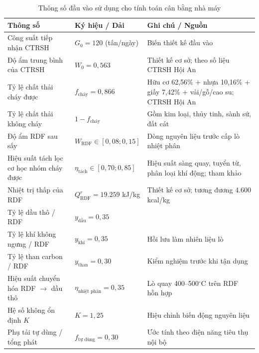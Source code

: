 \documentclass[../main.tex]{subfiles}
\begin{document}
\begin{table}[htbp]
\centering
\caption{Thông số đầu vào sử dụng cho tính toán cân bằng nhà máy}
\label{tab:thong-so-dau-vao}
\setlength{\tabcolsep}{5pt}
\small
\begin{tabular}{p{}p{}p{}}
\toprule
\textbf{Thông số} & \textbf{Ký hiệu / Dải} & \textbf{Ghi chú / Nguồn} \\
\midrule
Công suất tiếp nhận CTRSH & $G_0 = 120$ (tấn/ngày) & Biến thiết kế đầu vào \\
\midrule
Độ ẩm trung bình của CTRSH & $W_0 = 0{,}563$ & Thiết kế cơ sở; theo số liệu CTRSH Hội An \cite{BaocaoHoiAn2024} \\
\midrule
Tỷ lệ chất thải cháy được & $f_{\text{cháy}} = 0{,}866$ & Hữu cơ 62,56\% + nhựa 10,16\% + giấy 7,42\% + vải/gỗ/cao su; CTRSH Hội An \\
\midrule
Tỷ lệ chất thải không cháy & $1 - f_{\text{cháy}}$ & Gồm kim loại, thủy tinh, sành sứ, đất cát \\
\midrule
Độ ẩm RDF sau sấy & $W_{\text{RDF}} \in [0{,}08; 0{,}15]$ & Dòng nguyên liệu trước cấp lò nhiệt phân \\
\midrule
Hiệu suất tách lọc cơ học nhóm cháy được & $\eta_{\text{tách}} \in [0{,}70; 0{,}85]$ & Hiệu suất sàng quay, tuyển từ, phân loại khí động; tham khảo \cite{Arena2012} \\
\midrule
Nhiệt trị thấp của RDF & $Q_{\text{RDF}}^r = 19.259$ kJ/kg & Thiết kế cơ sở; tương đương 4.600 kcal/kg \cite{Arena2012,Sharuddin2016} \\
\midrule
Tỷ lệ dầu thô / RDF & $y_{\text{dầu}} = 0{,}35$ & \cite{Sharuddin2016,Miandad2016} \\
\midrule
Tỷ lệ khí không ngưng / RDF & $y_{\text{khí}} = 0{,}35$ & Hồi lưu làm nhiên liệu lò \\
\midrule
Tỷ lệ than carbon / RDF & $y_{\text{than}} = 0{,}30$ & Kiểm nghiệm trước khi tận dụng \\
\midrule
Hiệu suất chuyển hóa RDF $\to$ dầu thô & $\eta_{\text{nhiệt phân}} = 0{,}35$ & Lò quay 400--500$^\circ$C trên RDF hỗn hợp \\
\midrule
Hệ số không ổn định $K$ & $K = 1{,}25$ & Hiệu chỉnh biến động nguyên liệu \\
\midrule
Phụ tải tự dùng / tổng phát & $f_{\text{tự dùng}} = 0{,}30$ & Ước tính theo điện năng tiêu thụ nội bộ \\
\bottomrule
\end{tabular}
\end{table}
\end{document}
